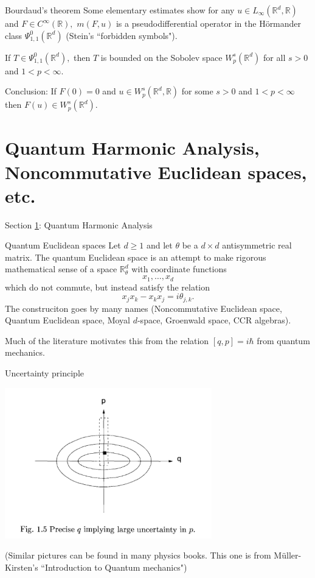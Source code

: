 \documentclass{beamer}
\numberwithin{equation}{section}
\theoremstyle{plain}
\theoremstyle{plain}
\theoremstyle{definition}
\theoremstyle{plain}
\theoremstyle{plain}
\theoremstyle{definition}
\newcommand{\Rl}{\mathbb{R}}
\begin{document}
\begin{frame}{Bourdaud's theorem}
    Some elementary estimates show for any $u\in L_{\infty}(\Rl^d,\Rl)$ and $F\in C^\infty(\Rl),$ $m(F,u)$ is a pseudodifferential operator in the H\"ormander class $\Psi^0_{1,1}(\Rl^d)$ (Stein's ``forbidden symbols").

    \begin{theorem}[Bourdaud (1988)]
        If $T \in \Psi^0_{1,1}(\Rl^d),$ then $T$ is bounded on the Sobolev space $W^s_p(\Rl^d)$ for all $s>0$ and $1<p<\infty.$
    \end{theorem}
\pause
    Conclusion: If $F(0)=0$ and $u\in W^s_p(\Rl^d,\Rl)$ for some $s>0$ and $1<p<\infty$ then $F(u)\in W^s_p(\Rl^d).$
\end{frame}

\section{Quantum Harmonic Analysis, Noncommutative Euclidean spaces, etc.}\label{qha_section}

\begin{frame}
    \Huge{Section \ref{qha_section}: Quantum Harmonic Analysis}
\end{frame}


\begin{frame}{Quantum Euclidean spaces}
    Let $d\geq 1$ and let $\theta$ be a $d\times d$ antisymmetric real matrix. The quantum Euclidean space is an attempt to make rigorous mathematical sense of a space $\Rl^d_\theta$ with coordinate functions
    \[
        x_1,\ldots,x_d
    \]
    which do not commute, but instead satisfy the relation
    \[
        x_jx_k-x_kx_j = i\theta_{j,k}.
    \]
    The construciton goes by many names (Noncommutative Euclidean space, Quantum Euclidean space, Moyal $d$-space, Groenwald space, CCR algebras).\pause

    Much of the literature motivates this from the relation $[q,p]=i\hbar$ from quantum mechanics.
\end{frame}

\begin{frame}{Uncertainty principle}
\begin{center}
    \includegraphics[width=90mm]{muller-kirsten-uncertainty.png}
\end{center}
(Similar pictures can be found in many physics books. This one is from M\"uller-Kirsten's ``Introduction to Quantum mechanics")
\end{frame}
\end{document}
